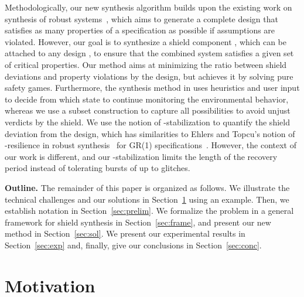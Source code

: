 \documentclass{llncs}
\begin{document}
Methodologically, our new synthesis algorithm builds upon the existing 
work on synthesis of robust systems~\cite{BloemCGHHJKK14}, which aims to 
generate a complete design that satisfies as many properties of a 
specification as possible if assumptions are violated.  However, our 
goal is to synthesize a shield component , which can be attached to 
any design , to ensure that the combined system  
satisfies a given set of critical properties.  Our method aims at 
minimizing the ratio between shield deviations and property violations 
by the design, but achieves it by solving pure safety games.  
Furthermore, the synthesis method in \cite{BloemCGHHJKK14} uses 
heuristics and user input to decide from which state to continue 
monitoring the environmental behavior, whereas we use a subset 
construction to capture all possibilities to avoid unjust verdicts by 
the shield.  We use the notion of -stabilization to quantify the 
shield deviation from the design, which has similarities to Ehlers and 
Topcu's notion of -resilience in robust synthesis~\cite{EhlersT14} 
for GR(1) specifications~\cite{BloemJPPS12}.  However, the context of 
our work is different, and our -stabilization limits the length of 
the recovery period instead of tolerating bursts of up to  glitches.


\noindent \textbf{Outline.}  
The remainder of this paper is organized as follows.  We illustrate the 
technical challenges and our solutions in Section~\ref{sec:ex} using an 
example.  Then, we establish notation in Section~\ref{sec:prelim}.  We 
formalize the problem in a general framework for shield synthesis in 
Section~\ref{sec:frame}, and present our new method in 
Section~\ref{sec:sol}.  We present our experimental results in 
Section~\ref{sec:exp} and, finally, give our conclusions in 
Section~\ref{sec:conc}.

\section{Motivation}
\label{sec:ex}
\end{document}
